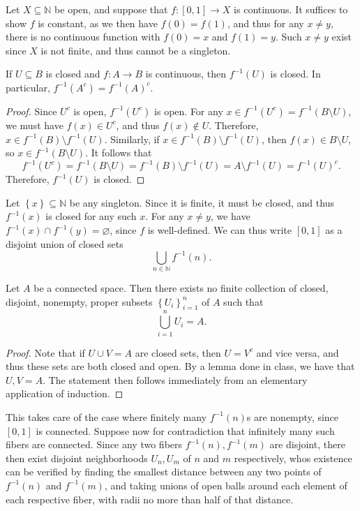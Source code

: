 \documentclass[11pt, letterpaper]{article}
\begin{document}
Let $X\subseteq \mathbb{N} $ be open, and suppose that $f : [0,1] \to X$ is continuous. It suffices to show $f$ is constant, as we then have $f(0)=f(1)$, and thus for any $x\neq y$, there is no continuous function with $f(0)=x$ and $f(1)=y$. Such $x\neq y$ exist since $X$ is not finite, and thus cannot be a singleton.
\begin{lemma}\label{lma:3.1}
	If $U\subseteq B$ is closed and $f : A \to B$ is continuous, then $f^{-1} (U)$ is closed. In particular, $f^{-1} (A^{c} )=f^{-1} (A)^{c} $.
\end{lemma}
\begin{proof}
	Since $U^{c} $ is open, $f^{-1} (U^{c} )$ is open. For any $x\in f^{-1} (U^{c} )=f^{-1} (B\setminus U)$, we must have $f(x)\in U^{c} $, and thus $f(x)\notin U$. Therefore, $x\in f^{-1} (B)\setminus f^{-1} (U)$. Similarly, if $x\in f^{-1} (B)\setminus f^{-1} (U)$, then $f(x)\in B\setminus U$, so $x\in f^{-1} (B\setminus U)$. It follows that
	\[
		f^{-1} (U^{c} )=f^{-1} (B\setminus U)=f^{-1} (B)\setminus f^{-1} (U)=A\setminus f^{-1} (U)=f^{-1} (U)^{c} 
	.\]
	Therefore, $f^{-1} \left( U \right) $ is closed.
\end{proof}
Let $\left\{ x \right\} \subseteq \mathbb{N} $ be any singleton. Since it is finite, it must be closed, and thus $f^{-1} (x)$ is closed for any such $x$. For any $x\neq y$, we have $f^{-1} (x) \cap f^{-1} (y)=\varnothing $, since $f$ is well-defined. We can thus write $[0,1]$ as a disjoint union of closed sets
\[
	\bigcup_{n\in\mathbb{N} } f^{-1} (n)
.\]
\begin{lemma}\label{lma:3.2}
	Let $A$ be a connected space. Then there exists no finite collection of closed, disjoint, nonempty, proper subsets $\left\{ U_i \right\}_{i=1}^n$ of $A$ such that
	\[
		\bigcup_{i=1} ^nU_i=A
	.\]
\end{lemma}
\begin{proof}
	Note that if $U\cup V=A$ are closed sets, then $U=V^{c} $ and vice versa, and thus these sets are both closed and open. By a lemma done in class, we have that $U,V=A$. The statement then follows immediately from an elementary application of induction.
\end{proof}
This takes care of the case where finitely many $f^{-1} (n)$s are nonempty, since $[0,1]$ is connected. Suppose now for contradiction that infinitely many such fibers are connected. Since any two fibers $f^{-1} (n),f^{-1} (m)$ are disjoint, there then exist disjoint neighborhoods $U_n,U_m$ of $n$ and $m$ respectively, whos existence can be verified by finding the smallest distance between any two points of $f^{-1} (n)$ and $f^{-1} (m)$, and taking unions of open balls around each element of each respective fiber, with radii no more than half of that distance.
\end{document}
